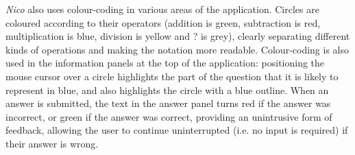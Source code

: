 \documentclass[12pt,twoside,notitlepage,xetex]{report}
\begin{document}
\emph{Nico} also uses colour-coding in various areas of the application.
Circles are coloured according to their operators (addition is green,
subtraction is red, multiplication is blue, division is yellow and {\sfapp ?}
is grey), clearly separating different kinds of operations and making the
notation more readable.  Colour-coding is also used in the information panels
at the top of the application: positioning the mouse cursor over a circle
highlights the part of the question that it is likely to represent in blue, and
also highlights the circle with a blue outline.  When an answer is submitted,
the text in the answer panel turns red if the answer was incorrect, or green if
the answer was correct, providing an unintrusive form of feedback, allowing the
user to continue uninterrupted (i.e. no input is required) if their answer is
wrong.
\end{document}
